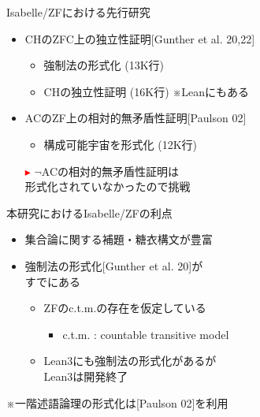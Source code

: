 \documentclass[17pt]{beamer}
\begin{document}
\begin{frame}{Isabelle/ZFにおける先行研究}
 
    {\small 
    \begin{itemize}[itemsep=8pt]
        \vspace{10pt}
        \item CHのZFC上の独立性証明{\small [Gunther et al. 20,22]}
            \vspace{3pt}
              {\small \begin{itemize}
                \item 強制法の形式化 (13K行)
                \item CHの独立性証明 (16K行) ※Leanにもある
              \end{itemize} }

        \item ACのZF上の相対的無矛盾性証明{\small [Paulson 02]}
              {\small \begin{itemize}
                      \item 構成可能宇宙を形式化 (12K行)
                  \end{itemize} }
    \end{itemize}
    \begin{itemize}
        \item [\textcolor{red}{$\blacktriangleright$}] $\neg$ACの相対的無矛盾性証明は\\
        形式化されていなかったので挑戦
    \end{itemize}
    }
\end{frame}

\begin{frame}{本研究におけるIsabelle/ZFの利点}
    \begin{itemize}
        \item 集合論に関する補題・糖衣構文が豊富
        \item 強制法の形式化{\small [Gunther et al. 20]}が\\すでにある
        {\small \begin{itemize}[itemsep=15pt]
            \vspace{10pt}
            \item ZFのc.t.m.の存在を仮定している
            \begin{itemize}
                \item c.t.m. : countable transitive model
            \end{itemize}
            \item Lean3にも強制法の形式化があるが\\
            Lean3は開発終了
        \end{itemize}}
    \end{itemize}
    {\small ※一階述語論理の形式化は[Paulson 02]を利用}
\end{frame}
\end{document}
